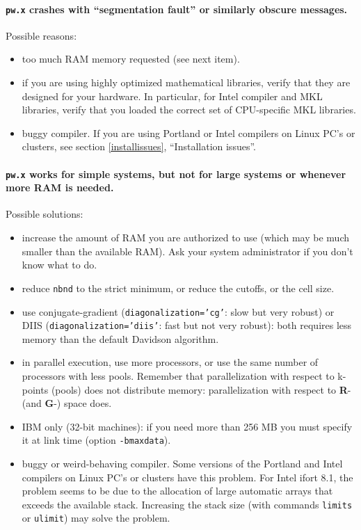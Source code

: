 \documentclass[12pt,a4paper]{article}
\begin{document}
\paragraph{\texttt{pw.x} crashes with ``segmentation fault'' or
           similarly obscure messages.}

Possible reasons:
\begin{itemize}
  \item
    too much RAM memory requested (see next item).
  \item
    if you are using highly optimized mathematical libraries, verify
    that they are designed for your hardware.
    In particular, for Intel compiler and MKL libraries, verify that
    you loaded the correct set of CPU-specific MKL libraries.
  \item
    buggy compiler.
    If you are using Portland or Intel compilers on Linux PC's or
    clusters, see section \ref{installissues}, ``Installation
    issues''.
\end{itemize}

\paragraph{\texttt{pw.x} works for simple systems, but not for large
           systems or whenever more RAM is needed.}

Possible solutions:
\begin{itemize}
  \item
    increase the amount of RAM you are authorized to use (which may be
    much smaller than the available RAM).
    Ask your system administrator if you don't know what to do.
  \item
    reduce \texttt{nbnd} to the strict minimum, or reduce the cutoffs,
    or the cell size.
  \item
    use conjugate-gradient (\texttt{diagonalization='cg'}: slow 
    but very robust) or DIIS (\texttt{diagonalization='diis'}: 
    fast but not very robust):
    both requires less memory than the default Davidson algorithm.
  \item
    in parallel execution, use more processors, or use the same number
    of processors with less pools.
    Remember that parallelization with respect to k-points (pools)
    does not distribute memory: parallelization with respect to
    \textbf{R}- (and \textbf{G}-) space does.
  \item
    IBM only (32-bit machines): if you need more than 256 MB you must
    specify it at link time (option \texttt{-bmaxdata}).
  \item
    buggy or weird-behaving compiler.
    Some versions of the Portland and Intel compilers on Linux PC's 
    or clusters have this problem. For Intel ifort 8.1, the problem
    seems to be due to the allocation of large automatic arrays
    that exceeds the available stack. Increasing the stack size 
    (with commands \texttt{limits} or \texttt{ulimit}) may solve the
    problem.
\end{itemize}
\end{document}
